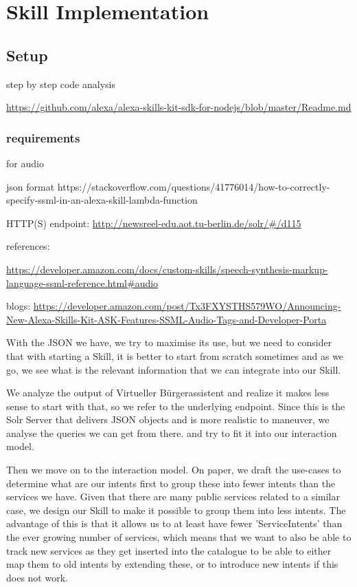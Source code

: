 \chapter{Skill Implementation}%
\label{maintwo}

\section{Setup}


step by step code analysis

\url{https://github.com/alexa/alexa-skills-kit-sdk-for-nodejs/blob/master/Readme.md}
\subsection{requirements}

for audio

json format https://stackoverflow.com/questions/41776014/how-to-correctly-specify-ssml-in-an-alexa-skill-lambda-function



HTTP(S) endpoint:
\url{http://newsreel-edu.aot.tu-berlin.de/solr/#/d115}


references:

\url{https://developer.amazon.com/docs/custom-skills/speech-synthesis-markup-language-ssml-reference.html#audio}



blogs:
\url{https://developer.amazon.com/post/Tx3FXYSTHS579WO/Announcing-New-Alexa-Skills-Kit-ASK-Features-SSML-Audio-Tags-and-Developer-Porta}

With the JSON we have, we try to maximise its use, but we need to consider that with starting a Skill, it is better to start from scratch sometimes and as we go, we see what is the relevant information that we can integrate into our Skill.

We analyze the output of Virtueller Bürgerassistent and realize it makes less sense to start with that, so we refer to the underlying endpoint. Since this is the Solr Server that delivers JSON objects and is more realistic to maneuver, we analyse the queries we can get from there. and try to fit it into our interaction model.

Then we move on to the interaction model. On paper, we draft the use-cases to determine what are our intents first to group these into fewer intents than the services we have. Given that there are many public services related to a similar case, we design our Skill to make it possible to group them into less intents. The advantage of this is that it allows us to at least have fewer 'ServiceIntents' than the ever growing number of services, which means that we want to also be able to track new services as they get inserted into the catalogue to be able to either map them to old intents by extending these, or to introduce new intents if this does not work.



